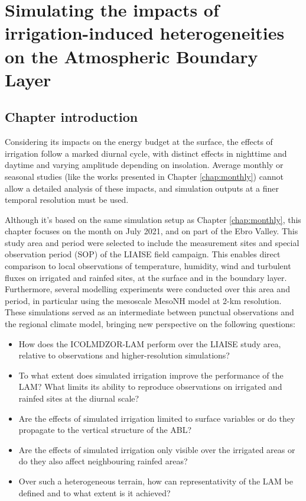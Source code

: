 \chapter{Simulating the impacts of irrigation-induced heterogeneities on the Atmospheric Boundary Layer}
\label{chap:liaise}
\minitoc
\pagebreak

\section{Chapter introduction}

Considering its impacts on the energy budget at the surface, the effects of irrigation follow a marked diurnal cycle, with distinct effects in nighttime and daytime and varying amplitude depending on insolation. Average monthly or seasonal studies (like the works presented in Chapter \ref{chap:monthly}) cannot allow a detailed analysis of these impacts, and simulation outputs at a finer temporal resolution must be used.

Although it's based on the same simulation setup as Chapter \ref{chap:monthly}, this chapter focuses on the month on July 2021, and on part of the Ebro Valley. This study area and period were selected to include the measurement sites and special observation period (SOP) of the LIAISE field campaign. This enables direct comparison to local observations of temperature, humidity, wind and turbulent fluxes on irrigated and rainfed sites, at the surface and in the boundary layer. Furthermore, several modelling experiments were conducted over this area and period, in particular using the mesoscale MesoNH model at 2-km resolution. These simulations served as an intermediate between punctual observations and the regional climate model, bringing new perspective on the following questions:

\begin{itemize}
    \item How does the ICOLMDZOR-LAM perform over the LIAISE study area, relative to observations and higher-resolution simulations?
    \item To what extent does simulated irrigation improve the performance of the LAM? What limits its ability to reproduce observations on irrigated and rainfed sites at the diurnal scale?
    \item Are the effects of simulated irrigation limited to surface variables or do they propagate to the vertical structure of the ABL? 
    \item Are the effects of simulated irrigation only visible over the irrigated areas or do they also affect neighbouring rainfed areas?
    \item Over such a heterogeneous terrain, how can representativity of the LAM be defined and to what extent is it achieved?
\end{itemize}

